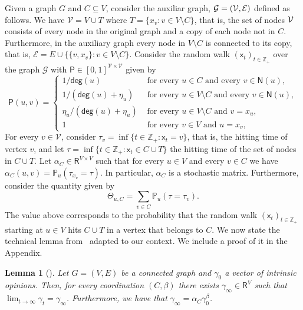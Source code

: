 \documentclass[letterpaper,11pt]{article}
\newcommand{\PP}{\mathbb{P}}
\newcommand{\RR}{\mathsf{R}}
\newcommand{\ZZ}{\mathbb{Z}}
\newcommand{\nsf}{\mathsf{N}}
\newcommand{\degsf}{\mathsf{deg}}
\newcommand{\psf}{\mathsf{P}}
\newcommand{\xsf}{\mathsf{x}}
\newtheorem{lemma}{Lemma}
\newcommand{\vvcom}[1]{\todo[color=red!25!white]{Victor: #1}}
\begin{document}
 Given a graph $G$ and $C\subseteq V$, consider the auxiliar graph, $\cal{G}=(\cal{V},\cal{E})$ defined as follows. 
We have $\mathcal{V}=V\cup T$ where $T=\{x_v:v\in V\setminus C\}$, that is, the set of nodes $\cal{V}$ consists of every node in the original graph and a copy of each node not in $C$. 
Furthermore, in the auxiliary graph every node in $V\setminus C$ is connected to its copy, that is, $\mathcal{E}=E\cup \{\{v,x_v\}:v\in V\setminus C\}$.
Consider the random walk $(\xsf_t)_{t\in \ZZ_+}$ over the graph $\mathcal{G}$ with $\psf\in [0,1]^{\mathcal{V}\times \mathcal{V}}$ given by
\[
\psf(u,v)=
\begin{cases}
1/\degsf(u) & \text{ for every }u\in C\text{ and every }v\in \nsf(u),\\
1/(\degsf(u)+\eta_u)& \text{ for every }u\in V\setminus C\text{ and every }v\in \nsf(u),\\
\eta_u/(\degsf(u)+\eta_u) & \text{ for every }u\in V\setminus C\text{ and }v=x_u,\\
1 & \text{ for every }v\in V\text{ and }u=x_v,
\end{cases}
\]
For every $v\in \mathcal{V}$, consider $\tau_v=\inf\{t\in \ZZ_+:\xsf_t=v\}$, that is, the hitting time of vertex $v$, and let $\tau=\inf\{t\in \ZZ_+:\xsf_t\in C\cup T\}$ the hitting time of the set of nodes in $C\cup T$.
Let $\alpha_C\in \RR^{V\times V}$ such that for every $u\in V$ and every $v\in C$ we have $\alpha_C(u,v)=\PP_u(\tau_{x_v}=\tau)$. 
In particular, $\alpha_C$ is a stochastic matrix.
Furthermore, consider the quantity given by
\begin{equation*}
\Theta_{u,C}=\sum_{v\in C}\PP_u(\tau=\tau_{v}).
\end{equation*}
The value above corresponds to the probability that the random walk $(\xsf_t)_{t\in \ZZ_+}$ starting at $u\in V$ hits $C\cup T$ in a vertex that belongs to $C$.
We now state the technical lemma from~\cite{} adapted to our context.
We include a proof of it in the Appendix. 
\begin{lemma}[\cite{GS12}]
Let $G=(V,E)$ be a connected graph and $\gamma_0$ a vector of intrinsic opinions. 
Then, for every coordination $(C,\beta)$ there exists $\gamma_{\infty}\in \RR^V$ such that $\displaystyle\lim_{t\to \infty}\gamma_t=\gamma_{\infty}$.
Furthermore, we have that $\gamma_{\infty}=\alpha_C \gamma_0^{\beta}$.
\end{lemma}
\end{document}
